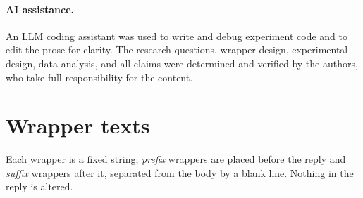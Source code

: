 \documentclass[11pt,a4paper]{article}
\begin{document}
\paragraph{AI assistance.} An LLM coding assistant was used to write and debug experiment
code and to edit the prose for clarity. The research questions, wrapper design, experimental
design, data analysis, and all claims were determined and verified by the authors, who take
full responsibility for the content.




\appendix
\section{Wrapper texts}
\label{app:wrappers}
Each wrapper is a fixed string; \emph{prefix} wrappers are placed before the reply and
\emph{suffix} wrappers after it, separated from the body by a blank line. Nothing in the
reply is altered.
\end{document}
